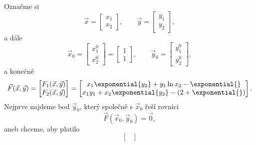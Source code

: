 \documentclass[answers]{exam}
\begin{document}
\begin{questions}
  \begin{solution}
		Označme si
    \begin{equation*}
      \vec{x}
      =
      \begin{bmatrix}
        x_1
        \\
        x_2
      \end{bmatrix}
      ,
      \qquad
      \vec{y}
      =
      \begin{bmatrix}
        y_1
        \\
        y_2
      \end{bmatrix},
    \end{equation*}
    a dále
    \begin{equation*}
      \vec{x}_0
      =
      \begin{bmatrix}
        x_1^0
        \\
        x_2^0
      \end{bmatrix}
      =
      \begin{bmatrix}
        1 \\
        1
      \end{bmatrix}
      ,
      \qquad
      \vec{y}_0
      =
      \begin{bmatrix}
        y_1^0
        \\
        y_2^0
      \end{bmatrix},
    \end{equation*}
    a konečně
    \begin{equation*}
      \vec{F}(\vec{x}, \vec{y})
      =
      \begin{bmatrix}
        F_1(\vec{x}, \vec{y}) \\
        F_2(\vec{x}, \vec{y}) \\
      \end{bmatrix}
      =
      \begin{bmatrix}
        x_1\exponential{y_2} + y_1 \ln x_2 - \exponential{} \\
        x_1 y_1 + x_2 \exponential{y_2} - (2 + \exponential{})
      \end{bmatrix}
      .
    \end{equation*}
    Nejprve najdeme bod $\vec{y}_0$, který společně s $\vec{x}_0$ řeší rovnici
    \begin{equation*}
      \vec{F}(\vec{x}_0, \vec{y}_0) = \vec{0},
    \end{equation*}
    aneb chceme, aby platilo
    \begin{equation*}
      \begin{bmatrix}

\end{bmatrix}
\end{equation*}
\end{solution}
\end{questions}
\end{document}
